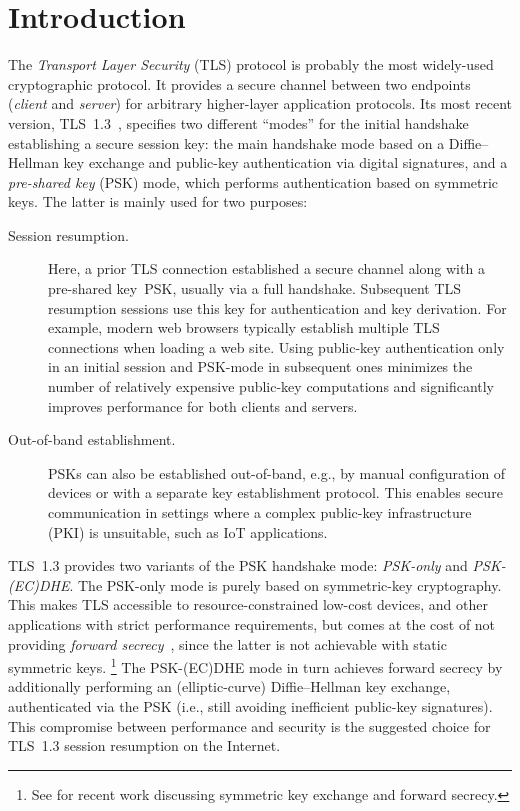 \section{Introduction}
\label{sec:intro}

The \emph{Transport Layer Security} (TLS) protocol is probably the most widely-used cryptographic protocol.
It provides a secure channel between two endpoints (\emph{client} and \emph{server}) for arbitrary higher-layer application protocols.
Its most recent version, TLS~1.3~\cite{rfc8446}, specifies two different ``modes'' for the initial handshake establishing a secure session key:
the main handshake mode based on a Diffie--Hellman key exchange and public-key authentication via digital signatures,
and a \emph{pre-shared key} (PSK) mode, which performs authentication based on symmetric keys.
The latter is mainly used for two purposes:
\begin{description}
	\item[Session resumption.]
	Here, a prior TLS connection established a secure channel along with a pre-shared key~PSK, usually via a full handshake.
	Subsequent TLS resumption sessions use this key for authentication and key derivation.
	For example, modern web browsers typically establish multiple TLS connections when loading a web site.
	Using public-key authentication only in an initial session and PSK-mode in subsequent ones minimizes the number of relatively expensive public-key computations and significantly improves performance for both clients and servers.
	
	\item[Out-of-band establishment.]
	PSKs can also be established out-of-band, e.g., by manual configuration of devices or with a separate key establishment protocol.
	This enables secure communication in settings where a complex public-key infrastructure (PKI) is unsuitable, such as IoT applications.
\end{description}

TLS~1.3 provides two variants of the PSK handshake mode: \emph{PSK-only} and \emph{PSK-(EC)DHE}.
%
The PSK-only mode is purely based on symmetric-key cryptography.
This makes TLS accessible to resource-constrained low-cost devices, and other applications with strict performance requirements,
but comes at the cost of not providing \emph{forward secrecy}~\cite{EC:Gunther89a}, since the latter is not achievable with static symmetric keys.%
\footnote{See \cite{RSA:AvoCanFer20,AC:BDdGJM21} for recent work discussing symmetric key exchange and forward secrecy.}
%
The PSK-(EC)DHE mode in turn achieves forward secrecy by additionally performing an (elliptic-curve) Diffie--Hellman key exchange, authenticated via the PSK (i.e., still avoiding inefficient public-key signatures).
This compromise between performance and security is the suggested choice for TLS~1.3 session resumption on the Internet.


